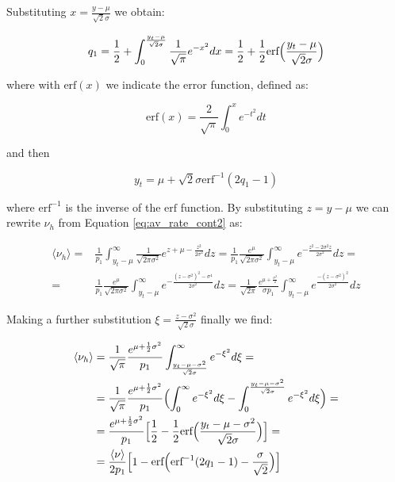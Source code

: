 \documentclass[a4paper, 12pt, twoside, openright]{book}
\begin{document}
Substituting $x= \frac{y-\mu}{\sqrt{2} \sigma}$ we obtain:

\begin{equation}
    q_1=\frac{1}{2}+ \int_{0}^{\frac{y_t-\mu}{\sqrt{2} \sigma}} \frac{1}{\sqrt{\pi}} e^{-x^2} dx = \frac{1}{2}+\frac{1}{2} \text{erf}\Bigl(\frac{y_t-\mu}{\sqrt{2}\sigma}\Bigr)
\end{equation}

where with $\text{erf}(x)$ we indicate the error function, defined as:

\begin{equation}
    \text{erf}(x)= \frac{2}{\sqrt{\pi}} \int_{0}^x e^{-t^2} dt
\end{equation}

and then

\begin{equation}
 y_t=\mu+\sqrt{2}\sigma \text{erf}^{-1}(2q_1-1)
\end{equation}

where $\text{erf}^{-1}$ is the inverse of the $\text{erf}$ function. By substituting $z=y-\mu$ we can rewrite $\nu_h$ from Equation \eqref{eq:av_rate_cont2} as:

\begin{equation}
\begin{split}
 \langle \nu_h \rangle=&  
  \frac{1}{p_1}\int_{y_{t}-\mu}^\infty  \frac{1}{\sqrt{2\pi \sigma^2}} e^{z+\mu-\frac{z^2}{2\sigma^2} } dz =   \frac{1}{p_1} \frac{e^\mu}{\sqrt{2\pi \sigma^2}}  \int_{y_{t}-\mu}^\infty e^{-\frac{z^2 -2\sigma^2z}{2\sigma^2} } dz= \\
 =&\frac{1}{p_1} \frac{e^\mu}{\sqrt{2\pi \sigma^2}}  \int_{y_{t}-\mu}^\infty e^{-\frac{(z -\sigma^2)^2-\sigma^4}{2\sigma^2} } dz =
     \frac{1}{\sqrt{2\pi}}\frac{e^{\mu+\frac{\sigma^2}{2}}}{\sigma p_1} \int_{y_{t} -\mu}^\infty e^{\frac{-(z-\sigma^2)^2}{2 \sigma^2}}dz
    \end{split}
\end{equation}

Making a further substitution $\xi=\frac{z-\sigma^2}{ \sqrt{2} \sigma}$ finally we find:

\begin{equation}
\begin{split}
    \langle \nu_h \rangle&= \frac{1}{\sqrt{\pi}} \frac{e^{\mu + \frac{1}{2}\sigma^2}}{p_1} \int_{\frac{y_{t} -\mu-\sigma^2}{\sqrt{2}\sigma}}^\infty e^{-\xi^2}d\xi=\\
     &= \frac{1}{\sqrt{\pi}} \frac{e^{\mu + \frac{1}{2}\sigma^2}}{p_1} \Bigl(\int_{0}^\infty e^{-\xi^2}d\xi- \int_{0}^{\frac{y_{t} -\mu-\sigma^2}{\sqrt{2}\sigma}} e^{-\xi^2}d\xi \Bigr)=\\
     &=\frac{e^{\mu + \frac{1}{2}\sigma^2}}{p_1}\Bigl[\frac{1}{2}- \frac{1}{2} \text{erf} \Bigl(\frac{y_{t} -\mu-\sigma^2}{\sqrt{2}\sigma} \Bigr) \Bigr]=\\
     &=\frac{\langle \nu \rangle }{2 p_1}\Bigl[1- \text{erf} \Bigl(\text{erf}^{-1}(2q_1-1) -\frac{\sigma}{\sqrt{2}}\Bigr) \Bigr]
    \end{split}
\end{equation}
\end{document}
